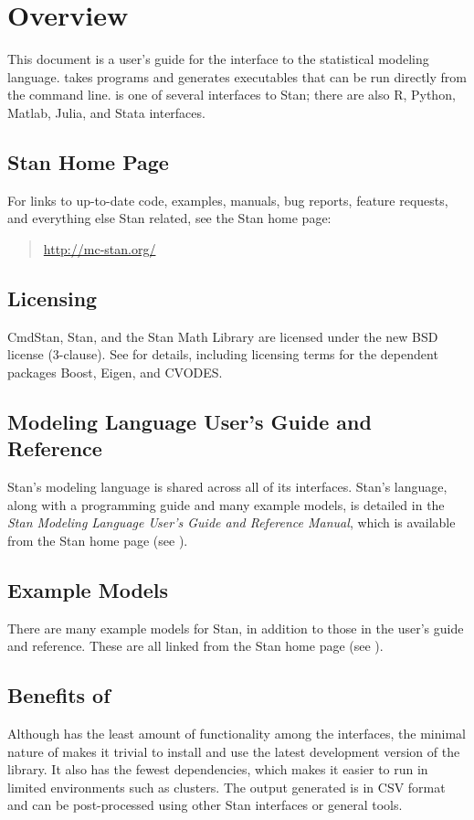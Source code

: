 \chapter{Overview}

\noindent
This document is a user's guide for the \CmdStan interface to the
\Stan statistical modeling language. \CmdStan takes \Stan programs
and generates executables that can be run directly from the command
line. \CmdStan is one of several interfaces to Stan; there are also R,
Python, Matlab, Julia, and Stata interfaces.

\section{Stan Home Page}\label{home-page.section}

For links to up-to-date code, examples, manuals, bug reports, feature
requests, and everything else Stan related, see the Stan home page:
%
\begin{quote}
\url{http://mc-stan.org/}
\end{quote}


\section{Licensing}

CmdStan, Stan, and the Stan Math Library are licensed under the new
BSD license (3-clause).  See  for details,
including licensing terms for the dependent packages Boost, Eigen, and
CVODES.


\section{Modeling Language User's Guide and Reference}

Stan's modeling language is shared across all of its interfaces.
Stan's language, along with a programming guide and many example
models, is detailed in the {\it Stan Modeling Language User's Guide
  and Reference Manual}, which is available from the Stan home page
(see ).

\section{Example Models}

There are many example models for Stan, in addition to those in the
user's guide and reference. These are all linked from the Stan home
page (see ).


\section{Benefits of \CmdStan}

Although \CmdStan has the least amount of functionality among the
\Stan interfaces, the minimal nature of \CmdStan makes it trivial to
install and use the latest development version of the \Stan
library. It also has the fewest dependencies, which makes it easier to
run in limited environments such as clusters. The output generated is
in CSV format and can be post-processed using other Stan interfaces or
general tools.
